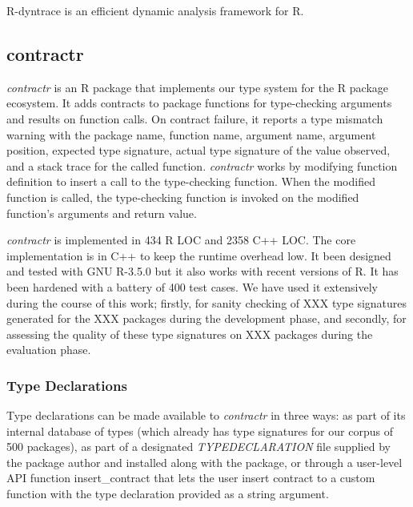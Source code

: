 \documentclass[acmsmall,review,anonymous]{acmart}\settopmatter{printfolios=true,printccs=false,printacmref=false}
\newcommand{\contractr}{\emph{contractr}\xspace} %
\begin{document}

R-dyntrace is an efficient dynamic analysis framework for R.

\subsection{contractr}
\label{sec:contractr}


\contractr is an R package that implements our type system for the R
package ecosystem. It adds contracts to package functions for type-checking
arguments and results on function calls. On contract failure, it reports a type
mismatch warning with the package name, function name, argument name, argument
position, expected type signature, actual type signature of the value observed,
and a stack trace for the called function. \contractr works by modifying
function definition to insert a call to the type-checking function. When the
modified function is called, the type-checking function is invoked on the
modified function's arguments and return value.

\contractr is implemented in 434 R LOC and 2358 C++ LOC. The core
implementation is in C++ to keep the runtime overhead low. It been designed and
tested with GNU R-3.5.0 but it also works with recent versions of R. It has been
hardened with a battery of 400 test cases. We have used it extensively during
the course of this work; firstly, for sanity checking of XXX type signatures
generated for the XXX packages during the development phase, and secondly, for
assessing the quality of these type signatures on XXX packages during the
evaluation phase.

%
%
\subsubsection{Type Declarations}
Type declarations can be made available to \contractr in three ways: as
part of its internal database of types (which already has type signatures for
our corpus of 500 packages), as part of a designated \emph{TYPEDECLARATION} file
supplied by the package author and installed along with the package, or through
a user-level API function insert\_contract that lets the user insert contract to
a custom function with the type declaration provided as a string argument.

%
%
\end{document}
